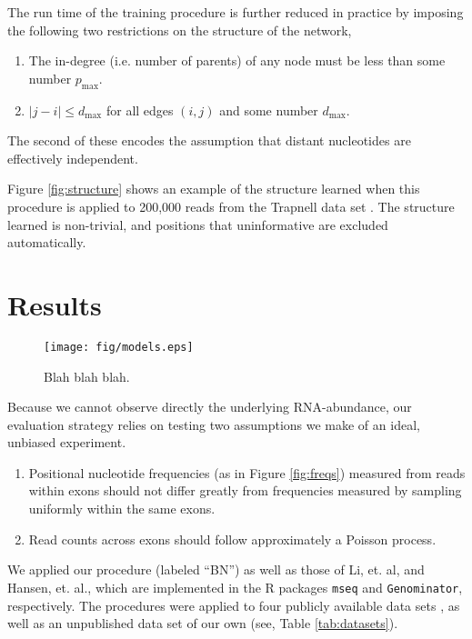 \documentclass{bioinfo}
\begin{document}
The run time of the training procedure is further reduced in practice by imposing the
following two restrictions on the structure of the network,
\begin{enumerate}
\item The in-degree (i.e. number of parents) of any node must be less than some
number $p_{\text{max}}$.
\item $|j - i| \le d_{\text{max}}$ for all edges $(i,j)$ and some number $d_{\text{max}}$.
\end{enumerate}
The second of these encodes the assumption that distant nucleotides are
effectively independent.


Figure \ref{fig:structure} shows an example of the structure learned when this
procedure is applied to 200,000 reads from the Trapnell data set
\cite{Trapnell2010}. The structure learned is non-trivial, and
positions that uninformative are excluded automatically.


\section{Results}

\begin{figure*}
\centerline{\texttt{[image: fig/models.eps]}}
\caption{Blah blah blah.}
\label{fig:models}
\end{figure*}


Because we cannot observe directly the underlying RNA-abundance, our evaluation
strategy relies on testing two assumptions we make of an ideal, unbiased experiment.
\begin{enumerate}
\item Positional nucleotide frequencies (as in Figure \ref{fig:freqs}) measured
from reads within exons should not differ greatly from frequencies measured by
sampling uniformly within the same exons.
\item Read counts across exons should follow approximately a Poisson process.
\end{enumerate}

We applied our procedure (labeled ``BN'') as well as those of Li, et. al, and
Hansen, et. al., which are implemented in the R packages \texttt{mseq} and
\texttt{Genominator}, respectively. The procedures were applied to four publicly
available data sets \cite{Bullard2010} \cite{Mortazavi2008} \cite{Trapnell2010}
\cite{Wetterbom2010}, as well as an unpublished data set of our own (see, Table
\ref{tab:datasets}).
\end{document}
